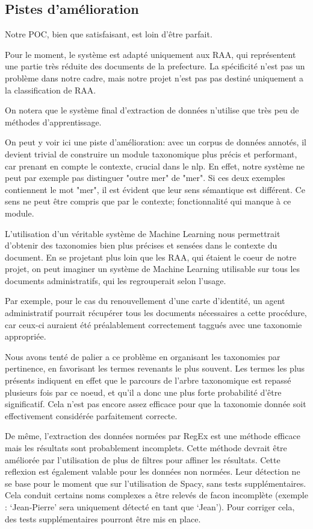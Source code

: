
\subsection {Pistes d'amélioration}
Notre POC, bien que satisfaisant, est loin d'être parfait.

Pour le moment, le système est adapté uniquement aux RAA, qui représentent une partie très réduite des documents de la prefecture.
La spécificité n'est pas un problème dans notre cadre, mais notre projet n'est pas pas destiné uniquement a la classification de RAA.


On notera que le système final d'extraction de données n'utilise que très peu de méthodes d'apprentissage.

On peut y voir ici une piste d'amélioration: avec un corpus de données annotés, il devient trivial de construire un module taxonomique plus précis et performant, car prenant en compte le contexte, crucial dans le \gls{nlp}.
En effet, notre système ne peut par exemple pas distinguer "outre mer" de "mer".
Si ces deux exemples contiennent le mot "mer", il est évident que leur sens sémantique est différent.
Ce sens ne peut être compris que par le contexte; fonctionnalité qui manque à ce module. 

L'utilisation d'un véritable système de Machine Learning nous permettrait d'obtenir des taxonomies bien plus précises et sensées dans le contexte du document.
En se projetant plus loin que les RAA, qui étaient le coeur de notre projet, on peut imaginer un système de Machine Learning utilisable sur tous les documents administratifs, qui les regrouperait selon l'usage.

Par exemple, pour le cas du renouvellement d'une carte d'identité, un agent administratif pourrait récupérer tous les documents nécessaires a cette procédure, car ceux-ci auraient été préalablement correctement taggués avec une taxonomie appropriée. 

Nous avons tenté de palier a ce problème en organisant les taxonomies par pertinence, en favorisant les termes revenants le plus souvent.
Les termes les plus présents indiquent en effet que le parcours de l'arbre taxonomique est repassé plusieurs fois par ce noeud, et qu'il a donc une plus forte probabilité d'être significatif.
Cela n'est pas encore assez efficace pour que la taxonomie donnée soit effectivement considérée parfaitement correcte.


De même, l'extraction des données normées par RegEx est une méthode efficace mais les résultats sont probablement incomplets.
Cette méthode devrait être améliorée par l'utilisation de plus de filtres pour affiner les résultats.
Cette reflexion est également valable pour les données non normées.
Leur détection ne se base pour le moment que sur l'utilisation de Spacy, sans tests supplémentaires.
Cela conduit certains noms complexes a être relevés de facon incomplète (exemple : `Jean-Pierre' sera uniquement détecté en tant que `Jean').
Pour corriger cela, des tests supplémentaires pourront être mis en place.



